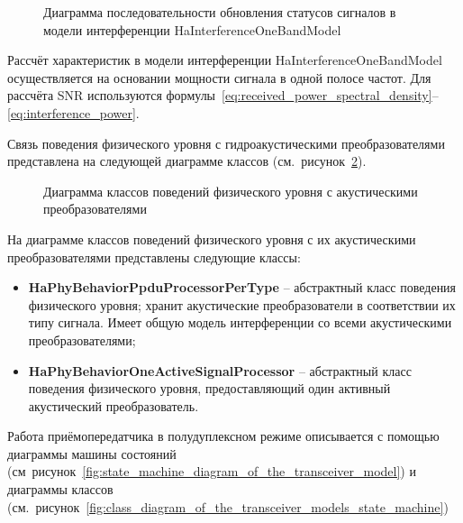 \documentclass[
    numbers=section,
    document-code={ВКРБ--09.03.04--10.19--XX--26--81}
]{../latex/fqw}
\begin{document}
    \begin{figure}[H]
        \centering
        \fbox{\rule{0pt}{20mm}\rule{40mm}{0pt}}
        \caption{Диаграмма последовательности обновления статусов сигналов
        в модели интерференции HaInterferenceOneBandModel}
        \label{fig:sequence_diagram_of_signal_status_updates_within_the_interference_model}
    \end{figure}

    Рассчёт характеристик в модели интерференции HaInterferenceOneBandModel
    осуществляется на основании мощности сигнала в одной полосе частот.
    Для рассчёта SNR используются формулы~\eqref{eq:received_power_spectral_density}--\eqref{eq:interference_power}.

    Связь поведения физического уровня с гидроакустическими преобразователями
    представлена на следующей диаграмме классов
    (см.~рисунок~\ref{fig:сlass_diagram_of_physical_layer_behaviors_with_acoustic_transducers}).

    \begin{figure}[H]
        \centering
        \fbox{\rule{0pt}{20mm}\rule{40mm}{0pt}}
        \caption{Диаграмма классов поведений физического уровня с акустическими преобразователями}
        \label{fig:сlass_diagram_of_physical_layer_behaviors_with_acoustic_transducers}
    \end{figure}

    На диаграмме классов поведений физического уровня с
    их акустическими преобразователями представлены следующие классы:

    \begin{itemize}
        \item \textbf{HaPhyBehaviorPpduProcessorPerType} -- абстрактный класс поведения физического уровня;
        хранит акустические преобразователи в соответствии их типу сигнала.
        Имеет общую модель интерференции со всеми акустическими преобразователями;
        \item
        \textbf{HaPhyBehaviorOneActiveSignalProcessor} -- абстрактный класс поведения физического уровня,
        предоставляющий один активный акустический преобразователь.
    \end{itemize}

    Работа приёмопередатчика в полудуплексном режиме описывается с помощью
    диаграммы машины состояний (см~рисунок~\ref{fig:state_machine_diagram_of_the_transceiver_model})
    и диаграммы классов (см.~рисунок~\ref{fig:class_diagram_of_the_transceiver_models_state_machine})
\end{document}
